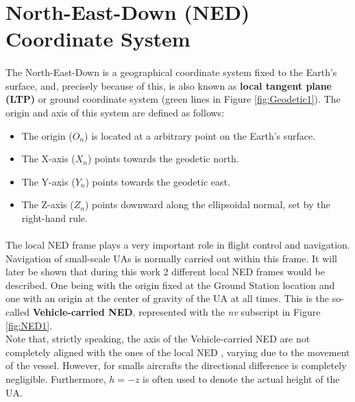 \section{North-East-Down (NED) Coordinate System}\label{sec:ned}

\paragraph{} The North-East-Down is a geographical coordinate system fixed to the Earth's surface, and, precisely because of this, is also known as \textbf{local tangent plane (LTP)} or ground coordinate system (green lines in Figure \ref{fig:Geodetic1}). The origin and axis of this system are defined as follows: 
\begin{itemize}
\item{The origin (\textbf{$O_{n}$}) is located at a arbitrary point on the Earth's surface.}
\item{The X-axis (\textbf{$X_{n}$}) points towards the geodetic north.}
\item{The Y-axis (\textbf{$Y_{n}$}) points towards the geodetic east.}
\item{The Z-axis (\textbf{$Z_{n}$}) points downward along the ellipsoidal normal, set by the right-hand rule.}
\end{itemize}

\paragraph{} The local NED frame plays a very important role in flight control and navigation.
Navigation of small-scale UAs is normally carried out within this frame. It will later be shown that during this work 2 different local NED frames would be described. One being with the origin fixed at the Ground Station location and one with an origin at the center of gravity of the UA at all times. This is the so-called \textbf{Vehicle-carried NED}, represented with the \textit{nv} subscript in Figure \ref{fig:NED1}\cite{Houghton70}.\\
Note that, strictly speaking, the axis of the Vehicle-carried NED are not completely aligned with the ones of the local NED , varying due to the movement of the vessel. However, for smalls aircrafts the directional difference is completely negligible. Furthermore, $h = -z$ is often used to denote the actual height of the UA.

